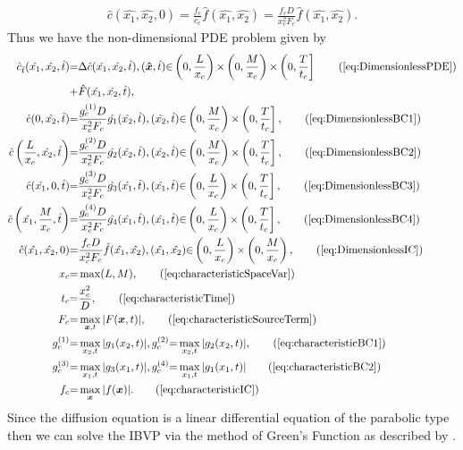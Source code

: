 \documentclass[\main/thesis.tex]{subfiles}
\begin{document}
\begin{align}
\hat{c}(\hat{x_1}, \hat{x_2}, 0) {=} \frac{f_c}{c_c} \hat{f}(\hat{x_1}, \hat{x_2})
                                                {=} \frac{f_c D}{x_c^2 F_c} \hat{f}(\hat{x_1}, \hat{x_2}).
\label{eq:DimensionlessIC}
\end{align}
Thus we have the non-dimensional PDE problem given by
\begin{align*}
\hat{c}_{\hat{t}}(\hat{x_1}, \hat{x_2}, \hat{t}) 
&{=} \Delta \hat{c}(\hat{x_1}, \hat{x_2}, \hat{t}), 
(\boldsymbol{\hat{x}}, \hat{t}) {\in} \left(0, \frac{L}{x_c}\right){\times}\left(0, \frac{M}{x_c}\right){\times}\left(0, \frac{T}{t_c}\right]
\tag{\ref{eq:DimensionlessPDE}}\\
&{+} \hat{F}(\hat{x_1}, \hat{x_2}, \hat{t}),\\
\hat{c}(0, \hat{x_2}, \hat{t})
&{=} \frac{g_c^{(1)} D}{x_c^2 F_c} \hat{g_1}(\hat{x_2}, \hat{t}),
(\hat{x_2}, \hat{t}) {\in} \left(0, \frac{M}{x_c}\right){\times}\left(0, \frac{T}{t_c}\right],
\tag{\ref{eq:DimensionlessBC1}}\\
\hat{c}\left(\frac{L}{x_c}, \hat{x_2}, \hat{t}\right)
&{=} \frac{g_c^{(2)} D}{x_c^2 F_c} \hat{g_2}(\hat{x_2}, \hat{t}),
(\hat{x_2}, \hat{t}) {\in} \left(0, \frac{M}{x_c}\right){\times}\left(0, \frac{T}{t_c}\right],
\tag{\ref{eq:DimensionlessBC2}}\\
\hat{c}(\hat{x_1}, 0, \hat{t}) 
&{=} \frac{g_c^{(3)} D}{x_c^2 F_c} \hat{g_3}(\hat{x_1}, \hat{t}),
(\hat{x_1}, \hat{t}) {\in} \left(0, \frac{L}{x_c}\right){\times}\left(0, \frac{T}{t_c}\right],
\tag{\ref{eq:DimensionlessBC3}}\\
\hat{c}\left(\hat{x_1}, \frac{M}{x_c}, \hat{t}\right)
&{=} \frac{g_c^{(4)} D}{x_c^2 F_c} \hat{g_4}(\hat{x_1}, \hat{t}),
(\hat{x_1}, \hat{t}) {\in} \left(0, \frac{L}{x_c}\right){\times}\left(0, \frac{T}{t_c}\right],
\tag{\ref{eq:DimensionlessBC4}}\\
\hat{c}(\hat{x_1}, \hat{x_2}, 0)
&{=} \frac{f_c D}{x_c^2 F_c} \hat{f}(\hat{x_1}, \hat{x_2}),
(\hat{x_1}, \hat{x_2}) {\in} \left(0, \frac{L}{x_c}\right){\times}\left(0, \frac{M}{x_c}\right),
\tag{\ref{eq:DimensionlessIC}}\\
x_c &{=} \max(L, M),
\tag{\ref{eq:characteristicSpaceVar}} \\
t_c &{=} \frac{x_c^2}{D},
\tag{\ref{eq:characteristicTime}}\\
F_c &{=} \max_{\boldsymbol{x}, t} | F(\boldsymbol{x}, t) |,
\tag{\ref{eq:characteristicSourceTerm}}\\
g_c^{(1)} &{=} \max_{x_2, t} | g_1(x_2, t) |, g_c^{(2)} {=} \max_{x_2, t} | g_2(x_2, t) |,
\tag{\ref{eq:characteristicBC1}}\\
g_c^{(3)} &{=} \max_{x_1, t} | g_3(x_1, t) |, g_c^{(4)} {=} \max_{x_1, t} | g_1(x_1, t) |
\tag{\ref{eq:characteristicBC2}}\\
f_c &{=} \max_{\boldsymbol{x}} | f(\boldsymbol{x}) |.
\tag{\ref{eq:characteristicIC}}
\end{align*}
Since the diffusion equation is a linear differential equation of the parabolic type then 
we can solve the IBVP via the method of Green's Function as described by \textcite{Polyanin}. 
\end{document}

